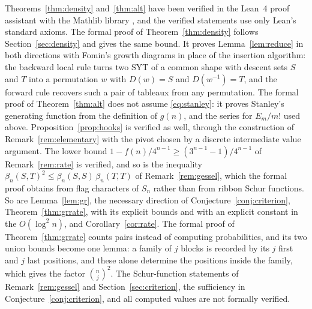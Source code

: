 \documentclass[12pt]{article}
\numberwithin{theorem}{section}
\numberwithin{equation}{section}
\begin{document}
Theorems~\ref{thm:density} and~\ref{thm:alt} have been verified in the Lean~4 proof assistant \cite{lean4}
with the Mathlib library \cite{mathlib}, and the verified statements use only Lean's standard axioms. The
formal proof of Theorem~\ref{thm:density} follows Section~\ref{sec:density} and gives the same bound. It
proves Lemma~\ref{lem:reduce} in both directions with Fomin's growth diagrams \cite{fomin} in place of the
insertion algorithm: the backward local rule turns two SYT of a common shape with descent sets $S$ and $T$
into a permutation $w$ with $D(w)=S$ and $D(w^{-1})=T$, and the forward rule recovers such a pair of
tableaux from any permutation. The formal proof of Theorem~\ref{thm:alt} does not assume
\eqref{eq:stanley}: it proves Stanley's generating function from the definition of $g(n)$, and the series
for $E_m/m!$ used above. Proposition~\ref{prop:hooks} is verified as well, through the construction of
Remark~\ref{rem:elementary} with the pivot chosen by a discrete intermediate value argument. The lower bound
$1-f(n)/4^{n-1}\ge(3^{n-1}-1)/4^{n-1}$ of Remark~\ref{rem:rate} is verified, and so is the
inequality $\beta_n(S,T)^2\le\beta_n(S,S)\,\beta_n(T,T)$ of Remark~\ref{rem:gessel}, which the formal
proof obtains from flag characters of $S_n$ rather than from ribbon Schur functions. So are Lemma~\ref{lem:gr}, the necessary direction of Conjecture~\ref{conj:criterion}, Theorem~\ref{thm:grrate},
with its explicit bounds and with an explicit constant in the $O(\log^2n)$, and Corollary~\ref{cor:rate}. The
formal proof of Theorem~\ref{thm:grrate} counts pairs instead of computing probabilities, and its two union
bounds become one lemma: a family of $j$ blocks is recorded by its $j$ first and $j$ last positions, and these
alone determine the positions inside the family, which gives the factor $\binom nj^2$. The Schur-function statements of Remark~\ref{rem:gessel} and
Section~\ref{sec:criterion}, the sufficiency in Conjecture~\ref{conj:criterion}, and all computed values are
not formally verified.
\end{document}
